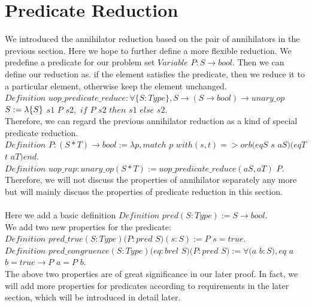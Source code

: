 \documentclass[a4paper,12pt,twoside,openright]{report}
\begin{document}
\section{Predicate Reduction}
We introduced the annihilator reduction based on the pair of annihilators in the previous section. Here we hope to further define a more flexible reduction. 
We predefine a predicate for our problem set $Variable$ $P : S \rightarrow bool$.
Then we can define our reduction as. if the element satisfies the predicate, then we reduce it to a particular element, otherwise keep the element unchanged.\\
$Definition$ $uop\_predicate\_reduce : \forall \{S : Type\}, 
S \rightarrow (S \rightarrow bool) \rightarrow unary\_op$ $S\\ 
  := \lambda  \{S\}$ $s1$ $P$ $s2,$ $if$ $P$ $s2$ $then$ $s1$ $else$ $s2.$\\
Therefore, we can regard the previous annihilator reduction as a kind of special predicate reduction.\\
$Definition$ $P : (S *T) \rightarrow bool := \lambda p, match$ $p$ $with (s, t) => orb (eqS$ $s$ $aS) (eqT$ $t$ $aT) end.$\\
$Definition$ $uop\_rap : unary\_op (S * T) := uop\_predicate\_reduce (aS, aT)$ $P.$\\
Therefore, we will not discuss the properties of annihilator separately any more but will mainly discuss the properties of predicate reduction in this section.\\\\
Here we add a basic definition $Definition$ $pred (S : Type):= S \rightarrow bool.$\\
We add two new properties for the predicate:\\
$Definition$ $pred\_true (S : Type) (P : pred$ $S) (s : S) 
  := P$ $s = true. $\\
$Definition$ $pred\_congruence (S : Type) (eq : brel$ $S) (P : pred$ $S) 
  := \forall (a$ $b : S), eq$ $a$ $b = true \rightarrow P$ $a = P$ $b.$\\
The above two properties are of great significance in our later proof.
In fact, we will add more properties for predicates according to requirements in the later section, which will be introduced in detail later.\\\\
\end{document}
